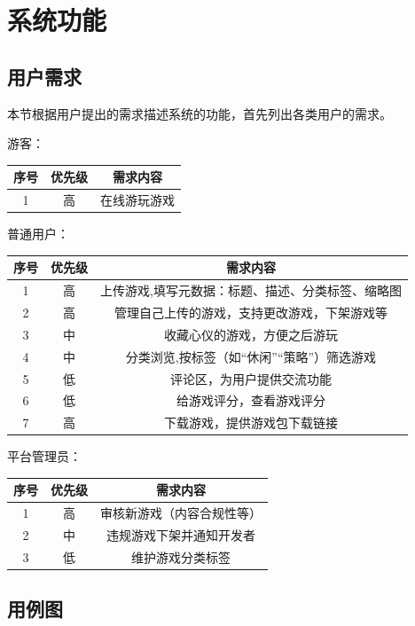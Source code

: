 \documentclass[12pt]{ctexart} %
\begin{document}
\section{系统功能}
\subsection{用户需求}
本节根据用户提出的需求描述系统的功能，首先列出各类用户的需求。

游客：

\begin{tabular}{|c|c|c|}
  \hline
  序号& 优先级& 需求内容\\
  \hline
  1 & 高& 在线游玩游戏\\
  \hline
\end{tabular}

\vspace{1cm}
普通用户：

\begin{tabular}{|c|c|c|}
  \hline
  序号& 优先级& 需求内容\\
  \hline
  1 & 高& 上传游戏,填写元数据：标题、描述、分类标签、缩略图\\
  \hline
  2 & 高& 管理自己上传的游戏，支持更改游戏，下架游戏等\\
  \hline
  3 & 中& 收藏心仪的游戏，方便之后游玩\\
  \hline
  4 & 中& 分类浏览,按标签（如“休闲”“策略”）筛选游戏\\
  \hline
  5 & 低& 评论区，为用户提供交流功能\\
  \hline
  6 & 低& 给游戏评分，查看游戏评分\\
  \hline
  7 & 高& 下载游戏，提供游戏包下载链接\\
  \hline
\end{tabular}

\vspace{1cm}
平台管理员：

\begin{tabular}{|c|c|c|}
  \hline
  序号& 优先级& 需求内容\\
  \hline
  1 & 高& 审核新游戏（内容合规性等）\\
  \hline
  2 & 中& 违规游戏下架并通知开发者\\
  \hline
  3 & 低& 维护游戏分类标签\\
  \hline
\end{tabular}

\subsection{用例图}
\end{document}
